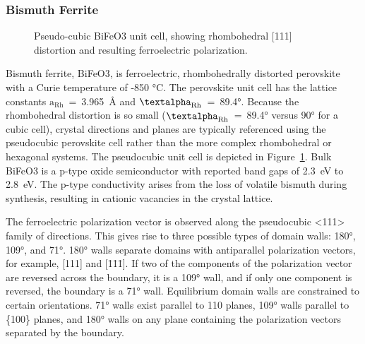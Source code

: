 \documentclass[12pt,%
              twoside,
               letterpaper]{uiothesis}
\begin{document}
\subsubsection{Bismuth Ferrite}
\label{subsubsec:background.bfo}

\begin{figure}
\begin{center}
\caption[Pseudo-cubic BiFeO3 unit cell]{%
	Pseudo-cubic BiFeO3 unit cell, showing rhombohedral [111] 
	distortion and resulting ferroelectric polarization.\cite{Catalan:2009ca}}
\label{fig:bfocell}
\end{center}
\end{figure}

Bismuth ferrite, BiFeO3, is ferroelectric, rhombohedrally distorted perovskite with a
Curie temperature of -850
\si{\degreeCelsius}.\cite{Kornev:2007jr,Catalan:2009ca,Anonymous:htMDB4Eh,Miao:2008fz} The
perovskite unit cell has the lattice constants
$\text{a}_{\text{Rh}}$~=~3.965~\si{\angstrom} and
$\text{\textalpha}_{\text{Rh}}$~=~89.4\si{\degree}.\cite{Kubel:1990kd} Because the
rhombohedral distortion is so small ($\text{\textalpha}_{\text{Rh}}$~=~89.4\si{\degree}
versus 90\si{\degree} for a cubic cell), crystal directions and planes are typically
referenced using the pseudocubic perovskite cell rather than the more complex rhombohedral
or hexagonal systems.  The pseudocubic unit cell is depicted in Figure~\ref{fig:bfocell}. Bulk
BiFeO3 is a p-type oxide semiconductor with reported band gaps of 2.3~eV to
2.8~eV.\cite{Ihlefeld:2008hl,Clark:2007bt,Kumar:2008fr} The p-type conductivity arises
from the loss of volatile bismuth during synthesis, resulting in cationic vacancies in the
crystal lattice. 

The ferroelectric polarization vector is observed along the pseudocubic <111> family of
directions.\cite{Catalan:2009ca} This gives rise to three possible types of domain walls:
180\si{\degree}, 109\si{\degree}, and 71\si{\degree}. 180\si{\degree} walls separate
domains with antiparallel polarization vectors, for example, [111] and [\={1}\={1}\={1}].
If two of the components of the polarization vector are reversed across the boundary, it
is a 109\si{\degree} wall, and if only one component is reversed, the boundary is a
71\si{\degree} wall. Equilibrium domain walls are constrained to certain orientations.
71\si{\degree} walls exist parallel to {110} planes, 109\si{\degree} walls parallel to
\{100\} planes, and 180\si{\degree} walls on any plane containing the polarization vectors
separated by the boundary.\cite{Streiffer:1998vt}
\end{document}
